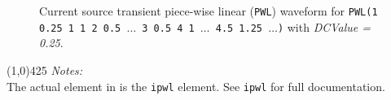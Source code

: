 \begin{figure}[h]
\centering

\caption[Current source transient piece-wise linear ({\tt PWL})
waveform]{Current source transient piece-wise linear ({\tt PWL})
waveform for\newline\hspace*{\fill} {\tt PWL(1 0.25  1 1 2 0.5
$\ldots$ 3 0.5 4 1 $\ldots$ 4.5 1.25 $\ldots$)} with {\it DCValue
= 0.25}.  \hspace*{\fill} }
\end{figure}
\newline
\linethickness{0.5mm} \line(1,0){425}
\newline
\textit{Notes:}\\
The actual element in \FDA is the \texttt{ipwl} element.
See \texttt{ipwl} for full documentation.\\
\newline

